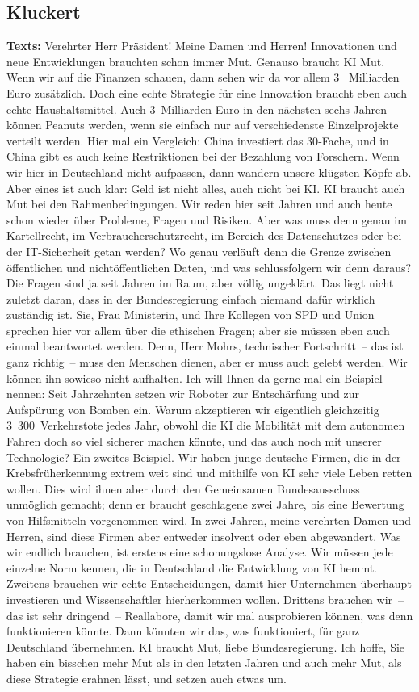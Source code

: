 \documentclass{article}
\begin{document}
\subsection{Kluckert}
\noindent\textbf{Texts:} Verehrter Herr Präsident! Meine Damen und Herren! Innovationen und neue Entwicklungen brauchten schon immer Mut. Genauso braucht KI Mut. Wenn wir auf die Finanzen schauen, dann sehen wir da vor allem 3  Milliarden Euro zusätzlich. Doch eine echte Strategie für eine Innovation braucht eben auch echte Haushaltsmittel.  Auch 3 Milliarden Euro in den nächsten sechs Jahren können Peanuts werden, wenn sie einfach nur auf verschiedenste Einzelprojekte verteilt werden. Hier mal ein Vergleich: China investiert das 30‑Fache, und in China gibt es auch keine Restriktionen bei der Bezahlung von Forschern. Wenn wir hier in Deutschland nicht aufpassen, dann wandern unsere klügsten Köpfe ab.  Aber eines ist auch klar: Geld ist nicht alles, auch nicht bei KI. KI braucht auch Mut bei den Rahmenbedingungen. Wir reden hier seit Jahren und auch heute schon wieder über Probleme, Fragen und Risiken. Aber was muss denn genau im Kartellrecht, im Verbraucherschutzrecht, im Bereich des Datenschutzes oder bei der IT-Sicherheit getan werden? Wo genau verläuft denn die Grenze zwischen öffentlichen und nichtöffentlichen Daten, und was schlussfolgern wir denn daraus? Die Fragen sind ja seit Jahren im Raum, aber völlig ungeklärt. Das liegt nicht zuletzt daran, dass in der Bundesregierung einfach niemand dafür wirklich zuständig ist.  Sie, Frau Ministerin, und Ihre Kollegen von SPD und Union sprechen hier vor allem über die ethischen Fragen; aber sie müssen eben auch einmal beantwortet werden. Denn, Herr Mohrs, technischer Fortschritt – das ist ganz richtig – muss den Menschen dienen, aber er muss auch gelebt werden. Wir können ihn sowieso nicht aufhalten.  Ich will Ihnen da gerne mal ein Beispiel nennen: Seit Jahrzehnten setzen wir Roboter zur Entschärfung und zur Aufspürung von Bomben ein. Warum akzeptieren wir eigentlich gleichzeitig 3 300 Verkehrstote jedes Jahr, obwohl die KI die Mobilität mit dem autonomen Fahren doch so viel sicherer machen könnte,  und das auch noch mit unserer Technologie? Ein zweites Beispiel. Wir haben junge deutsche Firmen, die in der Krebsfrüherkennung extrem weit sind und mithilfe von KI sehr viele Leben retten wollen. Dies wird ihnen aber durch den Gemeinsamen Bundesausschuss unmöglich gemacht; denn er braucht geschlagene zwei Jahre, bis eine Bewertung von Hilfsmitteln vorgenommen wird. In zwei Jahren, meine verehrten Damen und Herren, sind diese Firmen aber entweder insolvent oder eben abgewandert.  Was wir endlich brauchen, ist erstens eine schonungslose Analyse. Wir müssen jede einzelne Norm kennen, die in Deutschland die Entwicklung von KI hemmt. Zweitens brauchen wir echte Entscheidungen, damit hier Unternehmen überhaupt investieren und Wissenschaftler hierherkommen wollen. Drittens brauchen wir – das ist sehr dringend – Reallabore, damit wir mal ausprobieren können, was denn funktionieren könnte.  Dann könnten wir das, was funktioniert, für ganz Deutschland übernehmen. KI braucht Mut, liebe Bundesregierung. Ich hoffe, Sie haben ein bisschen mehr Mut als in den letzten Jahren und auch mehr Mut, als diese Strategie erahnen lässt, und setzen auch etwas um.  
\end{document}
